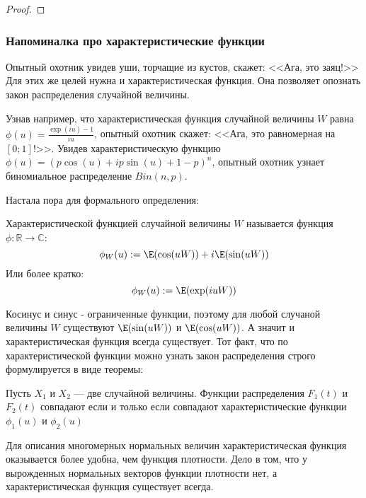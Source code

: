 \begin{proof}


\end{proof}



\subsubsection*{Напоминалка про характеристические функции}


Опытный охотник увидев уши, торчащие из кустов, скажет: <<Ага, это заяц!>> Для этих же целей нужна и характеристическая функция. Она позволяет опознать закон распределения случайной величины. 

Узнав например, что характеристическая функция случайной величины $W$ равна $\phi(u)=\frac{\exp(iu)-1}{iu}$, опытный охотник скажет: <<Ага, это равномерная на $[0;1]$!>>. Увидев характеристическую функцию $\phi(u)=(p\cos(u)+ip\sin(u)+1-p)^{n}$, опытный охотник узнает биномиальное распределение $Bin(n,p)$.

Настала пора для формального определения:

\begin{mydef}
Характеристической функцией случайной величины $W$ называется функция $\phi:\mathbb{R}\to \mathbb{C}$:
\begin{equation}
\phi_{W}(u):=\E(\cos(uW))+i\E(\sin(uW))
\end{equation}
Или более кратко:
\begin{equation}
\phi_{W}(u):=\E(\exp(iuW))
\end{equation}
\end{mydef}

Косинус и синус - ограниченные функции, поэтому для любой случаной величины $W$ существуют $\E(\sin(uW))$ и $\E(\cos(uW))$. А значит и характеристическая функция всегда существует.
Тот факт, что по характеристической функции можно узнать закон распределения строго формулируется в виде теоремы:


\begin{myth}
Пусть $X_{1}$ и $X_{2}$ --- две случайной величины. Функции распределения $F_{1}(t)$ и $F_{2}(t)$ совпадают если и только если совпадают характеристические функции $\phi_{1}(u)$ и $\phi_{2}(u)$
\end{myth}









Для описания многомерных нормальных величин характеристическая функция оказывается более удобна, чем функция плотности. Дело в том, что у вырожденных нормальных векторов функции плотности нет, а характеристическая функция существует всегда.



